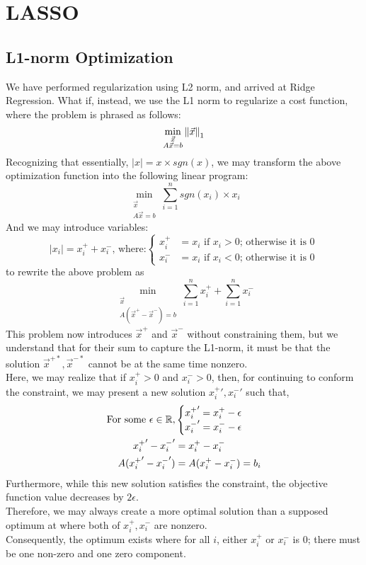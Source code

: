 \chapter{LASSO}

\section{L1-norm Optimization}
We have performed regularization using L2 norm, and arrived at Ridge Regression.
What if, instead, we use the L1 norm to regularize a cost function, where the problem is phrased as follows:
\[
    \min_{
        \substack{
            \vec{x} \\
            A \vec{x} = b
        }
    } {\| \vec{x} \|}_{1}^{}
\]
Recognizing that essentially, $|x| = x \times sgn(x)$, we may transform the above optimization function into the following linear program:
\[
    \min_{
        \substack{
            \vec{x} \\
            A \vec{x} = b
        }
    } \sum_{i = 1}^n sgn(x_i) \times x_i
\]
And we may introduce variables:
\[
    |x_i| = x_i^+ + x_i^- \text{, where:}
    \begin{cases}
        x_i^+ &= x_i \text{ if } x_i > 0 \text{; otherwise it is } 0 \\
        x_i^- &= x_i \text{ if } x_i < 0 \text{; otherwise it is } 0
    \end{cases}
\]
to rewrite the above problem as
\[
    \min_{
        \substack{
            \vec{x} \\
            A (\vec{x}^+ - \vec{x}^-) = b
        }
    } \sum_{i = 1}^n x_i^+ + \sum_{i = 1}^n x_i^-
\]
This problem now introduces $\vec{x}^+$ and $\vec{x}^-$ without constraining them, but we understand that for their sum to capture the L1-norm, it must be that the solution $\vec{x}^{+*}, \vec{x}^{-*}$ cannot be at the same time nonzero. \\
Here, we may realize that if $x_i^+ > 0$ and $x_i^- > 0$, then, for continuing to conform the constraint, we may present a new solution ${x_i^+}', {x_i^-}'$ such that,
\begin{align*}
    \text{For some } \epsilon \in \mathbb{R},
    &\begin{cases}
        {x_i^+}' = x_i^+ - \epsilon \\
        {x_i^-}' = x_i^- - \epsilon \\
    \end{cases} \\
    {x_i^+}' - {x_i^-}' &= {x_i^+} - {x_i^-} \\
    A({x_i^+}' - {x_i^-}') &= A({x_i^+} - {x_i^-}) = b_i
\end{align*}
Furthermore, while this new solution satisfies the constraint, the objective function value decreases by $2 \epsilon$. \\
Therefore, we may always create a more optimal solution than a supposed optimum at where both of $x_i^+, x_i^-$ are nonzero. \\
Consequently, the optimum exists where for all $i$, either $x_i^+$ or $x_i^-$ is $0$; there must be one non-zero and one zero component.

